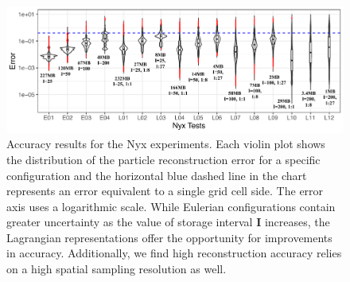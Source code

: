 \begin{figure}[!b]
\centering
\includegraphics[width=\linewidth]{Images/nyx_violinplot.pdf}
\vspace{-5mm}
\caption{Accuracy results for the Nyx experiments. Each violin plot shows the distribution of the particle reconstruction error for a specific configuration and the horizontal blue dashed line in the chart represents an error equivalent to a single grid cell side. The error axis uses a logarithmic scale. While Eulerian configurations contain greater uncertainty as the value of storage interval \textbf{I} increases, the Lagrangian representations offer the opportunity for improvements in accuracy. Additionally, we find high reconstruction accuracy relies on a high spatial sampling resolution as well.}
\label{fig:nyx_violinplot}
\end{figure}
